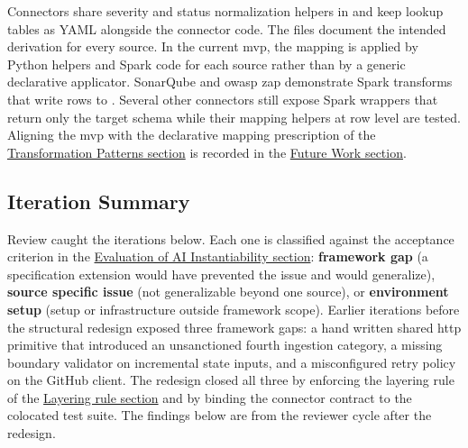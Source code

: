 Connectors share severity and status normalization helpers in  and keep lookup tables as YAML alongside the connector code. The  files document the intended derivation for every source. In the current \gls{mvp}, the mapping is applied by Python helpers and Spark code for each source rather than by a generic declarative applicator. SonarQube and \gls{owasp} \gls{zap} demonstrate Spark transforms that write rows to . Several other connectors still expose Spark wrappers that return only the target schema while their mapping helpers at row level are tested. Aligning the \gls{mvp} with the declarative mapping prescription of the \hyperref[sec:transformation-patterns]{Transformation Patterns section} is recorded in the \hyperref[sec:future-work]{Future Work section}.

\subsection{Iteration Summary}
\label{sec:iteration-summary}

Review caught the iterations below. Each one is classified against the acceptance criterion in the \hyperref[sec:ai-eval]{Evaluation of AI Instantiability section}: \textbf{framework gap} (a specification extension would have prevented the issue and would generalize), \textbf{source specific issue} (not generalizable beyond one source), or \textbf{environment setup} (setup or infrastructure outside framework scope). Earlier iterations before the structural redesign exposed three framework gaps: a hand written shared \gls{http} primitive that introduced an unsanctioned fourth ingestion category, a missing boundary validator on incremental state inputs, and a misconfigured retry policy on the GitHub client. The redesign closed all three by enforcing the layering rule of the \hyperref[sec:impl-layering-rule]{Layering rule section} and by binding the connector contract to the colocated test suite. The findings below are from the reviewer cycle after the redesign.

